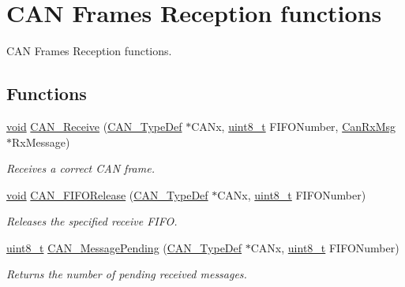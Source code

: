 \hypertarget{group___c_a_n___group3}{\section{C\-A\-N Frames Reception functions}
\label{group___c_a_n___group3}
}


C\-A\-N Frames Reception functions.  


\subsection*{Functions}
\begin{DoxyCompactItemize}
\item 
\hyperlink{group___n_a_m_e_ga18028b8badbf1ea7e704ccac3c488e82}{void} \hyperlink{group___c_a_n___group3_ga351b90bb8a3bb0c846f85bbd56ef4dc8}{C\-A\-N\-\_\-\-Receive} (\hyperlink{struct_c_a_n___type_def}{C\-A\-N\-\_\-\-Type\-Def} $\ast$C\-A\-Nx, \hyperlink{stdint_8h_aba7bc1797add20fe3efdf37ced1182c5}{uint8\-\_\-t} F\-I\-F\-O\-Number, \hyperlink{struct_can_rx_msg}{Can\-Rx\-Msg} $\ast$Rx\-Message)
\begin{DoxyCompactList}\small\item\em Receives a correct C\-A\-N frame. \end{DoxyCompactList}\item 
\hyperlink{group___n_a_m_e_ga18028b8badbf1ea7e704ccac3c488e82}{void} \hyperlink{group___c_a_n___group3_ga1bc3b39471e579b4101624c33d27918b}{C\-A\-N\-\_\-\-F\-I\-F\-O\-Release} (\hyperlink{struct_c_a_n___type_def}{C\-A\-N\-\_\-\-Type\-Def} $\ast$C\-A\-Nx, \hyperlink{stdint_8h_aba7bc1797add20fe3efdf37ced1182c5}{uint8\-\_\-t} F\-I\-F\-O\-Number)
\begin{DoxyCompactList}\small\item\em Releases the specified receive F\-I\-F\-O. \end{DoxyCompactList}\item 
\hyperlink{stdint_8h_aba7bc1797add20fe3efdf37ced1182c5}{uint8\-\_\-t} \hyperlink{group___c_a_n___group3_ga7100459a95ce1b3cfe8ab15e112029fe}{C\-A\-N\-\_\-\-Message\-Pending} (\hyperlink{struct_c_a_n___type_def}{C\-A\-N\-\_\-\-Type\-Def} $\ast$C\-A\-Nx, \hyperlink{stdint_8h_aba7bc1797add20fe3efdf37ced1182c5}{uint8\-\_\-t} F\-I\-F\-O\-Number)
\begin{DoxyCompactList}\small\item\em Returns the number of pending received messages. \end{DoxyCompactList}\end{DoxyCompactItemize}



